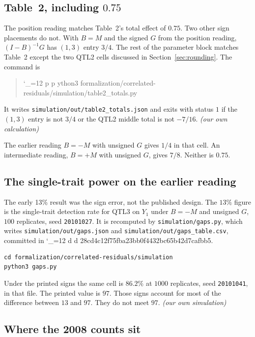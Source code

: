 \documentclass[11pt]{article}
\makeatletter
\newcommand{\sha}{\begingroup\catcode`\_=12 \sha@read}
\newcommand{\sha@read}[1]{\ttfamily\sha@loop#1\relax\endgroup}
\def\sha@loop#1{%
  \ifx\relax#1\else
    #1\allowbreak
    \expandafter\sha@loop
  \fi}
\newcommand{\ev}[1]{\textup{\emph{(#1)}}}
\makeatother
\begin{document}
\subsection{Table~2, including \(0.75\)}

The position reading matches Table~2's total effect of $0.75$. Two other
sign placements do not. With $B=M$ and the signed $G$ from the position reading,
$(I-B)^{-1}G$ has $(1,3)$ entry $3/4$. The rest of the parameter block
matches Table~2 except the two QTL2 cells discussed in
Section~\ref{sec:rounding}. The command is
\begin{quote}\noindent
\sha{python3 formalization/correlated-residuals/simulation/table2_totals.py}
\end{quote}
It writes \texttt{simulation/out/table2\_totals.json} and exits with status
$1$ if the $(1,3)$ entry is not $3/4$ or the QTL2 middle total is not
$-7/16$. \ev{our own calculation}

The earlier reading $B=-M$ with unsigned $G$ gives $1/4$ in that cell.
An intermediate reading, $B=+M$ with unsigned $G$, gives $7/8$. Neither is
$0.75$.

\subsection{The single-trait power on the earlier reading}

The early 13\% result was the sign error, not the published design. The $13\%$ figure is the single-trait detection rate for QTL3 on $Y_1$
under $B=-M$ and unsigned $G$, $100$ replicates, seed \texttt{20101027}.
It is recomputed by \texttt{simulation/gaps.py}, which writes
\texttt{simulation/out/gaps.json} and
\texttt{simulation/out/gaps\_table.csv}, committed in
\sha{d28cd4c12f75fba23bb0f4432bc65b42d7cafbb5}.
\begin{verbatim}
cd formalization/correlated-residuals/simulation
python3 gaps.py
\end{verbatim}
Under the printed signs the same cell is $86.2\%$ at $1000$ replicates,
seed \texttt{20101041}, in that file. The printed value is $97$. Those signs
account for most of the difference between $13$ and $97$. They do not meet
$97$. \ev{our own simulation}

\subsection{Where the 2008 counts sit}
\end{document}

